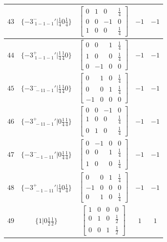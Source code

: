 \documentclass[fleqn,8pt]{jsarticle}
\begin{document}
\begin{longtable}{ccccc}
$ 43 $ & $ \{-3^{-}_{\,\,1-1-1}{}'|\frac{1}{4} 0 \frac{1}{4}\} $ & $ \begin{bmatrix} 0 & 1 & 0 & \frac{1}{4} \\ 0 & 0 & -1 & 0 \\ 1 & 0 & 0 & \frac{1}{4} \end{bmatrix} $ & $ -1 $ & $ -1 $ \\ \hline
$ 44 $ & $ \{-3^{+}_{\,\,1-1-1}{}'|\frac{1}{4} \frac{1}{4} 0\} $ & $ \begin{bmatrix} 0 & 0 & 1 & \frac{1}{4} \\ 1 & 0 & 0 & \frac{1}{4} \\ 0 & -1 & 0 & 0 \end{bmatrix} $ & $ -1 $ & $ -1 $ \\ \hline
$ 45 $ & $ \{-3^{-}_{\,\,-11-1}{}'|\frac{1}{4} \frac{1}{4} 0\} $ & $ \begin{bmatrix} 0 & 1 & 0 & \frac{1}{4} \\ 0 & 0 & 1 & \frac{1}{4} \\ -1 & 0 & 0 & 0 \end{bmatrix} $ & $ -1 $ & $ -1 $ \\ \hline
$ 46 $ & $ \{-3^{+}_{\,\,-11-1}{}'|0 \frac{1}{4} \frac{1}{4}\} $ & $ \begin{bmatrix} 0 & 0 & -1 & 0 \\ 1 & 0 & 0 & \frac{1}{4} \\ 0 & 1 & 0 & \frac{1}{4} \end{bmatrix} $ & $ -1 $ & $ -1 $ \\ \hline
$ 47 $ & $ \{-3^{-}_{\,\,-1-11}{}'|0 \frac{1}{4} \frac{1}{4}\} $ & $ \begin{bmatrix} 0 & -1 & 0 & 0 \\ 0 & 0 & 1 & \frac{1}{4} \\ 1 & 0 & 0 & \frac{1}{4} \end{bmatrix} $ & $ -1 $ & $ -1 $ \\ \hline
$ 48 $ & $ \{-3^{+}_{\,\,-1-11}{}'|\frac{1}{4} 0 \frac{1}{4}\} $ & $ \begin{bmatrix} 0 & 0 & 1 & \frac{1}{4} \\ -1 & 0 & 0 & 0 \\ 0 & 1 & 0 & \frac{1}{4} \end{bmatrix} $ & $ -1 $ & $ -1 $ \\ \hline
$ 49 $ & $ \{1|0 \frac{1}{2} \frac{1}{2}\} $ & $ \begin{bmatrix} 1 & 0 & 0 & 0 \\ 0 & 1 & 0 & \frac{1}{2} \\ 0 & 0 & 1 & \frac{1}{2} \end{bmatrix} $ & $ 1 $ & $ 1 $ \\ \hline

\end{longtable}
\end{document}
